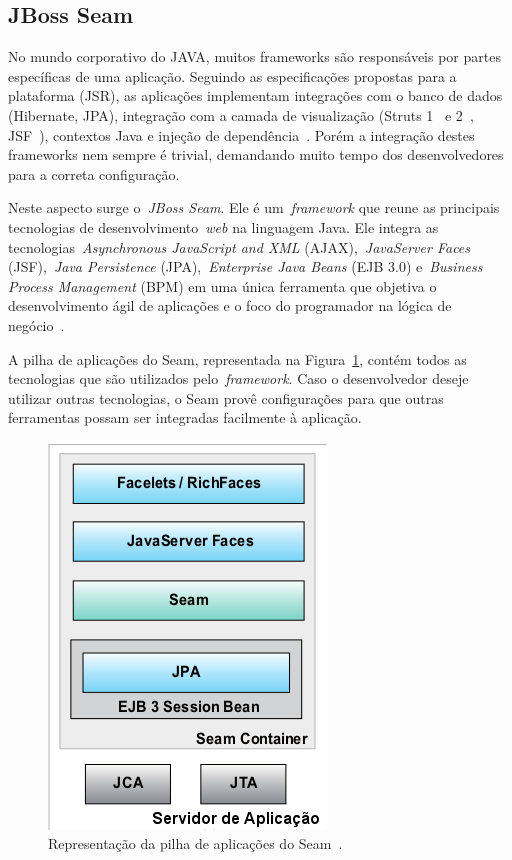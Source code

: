 \subsection{JBoss Seam}

No mundo corporativo do JAVA, muitos frameworks são responsáveis por partes específicas de uma aplicação. Seguindo as especificações propostas para a plataforma (JSR), as aplicações implementam integrações com o banco de dados (Hibernate, JPA), integração com a camada de visualização (Struts 1~\cite{struts1} e 2~\cite{struts2}, JSF~\cite{jsf2012}), contextos Java e injeção de dependência~\cite{di2012}. Porém a integração destes frameworks nem sempre é trivial, demandando muito tempo dos desenvolvedores para a correta configuração.

Neste aspecto surge o~\emph{JBoss Seam}. Ele é um~\emph{framework} que reune as principais tecnologias de desenvolvimento~\emph{web} na linguagem Java. Ele integra as tecnologias~\emph{Asynchronous JavaScript and XML} (AJAX),~\emph{JavaServer Faces} (JSF),~\emph{Java Persistence} (JPA),~\emph{Enterprise Java Beans} (EJB 3.0) e~\emph{Business Process Management} (BPM) em uma única ferramenta que objetiva o desenvolvimento ágil de aplicações e o foco do programador na lógica de negócio~\cite{seamSite}.

A pilha de aplicações do Seam, representada na Figura~\ref{fig:servidor-app-seam}, contém todos as tecnologias que são utilizados pelo~\emph{framework}. Caso o desenvolvedor deseje utilizar outras tecnologias, o Seam provê configurações para que outras ferramentas possam ser integradas facilmente à aplicação.

\begin{figure}
	\centering
	\includegraphics[scale=0.65]{images/servidor-app-seam.png}
	\caption{Representação da pilha de aplicações do Seam~\cite{allen09}.}
	\label{fig:servidor-app-seam}
\end{figure}

